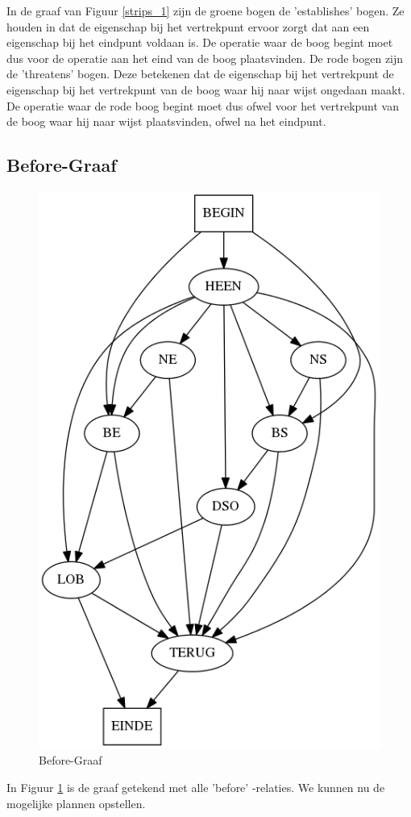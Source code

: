 \documentclass[alternative-exam.tex]{subfiles}
\begin{document}
In de graaf van Figuur \ref{strips_1} zijn de groene bogen de 'establishes' bogen. Ze houden in dat de eigenschap bij het vertrekpunt ervoor zorgt dat aan een eigenschap bij het eindpunt voldaan is. De operatie waar de boog begint moet dus voor de operatie aan het eind van de boog plaatsvinden.
De rode bogen zijn de 'threatens' bogen. Deze betekenen dat de eigenschap bij het vertrekpunt de eigenschap bij het vertrekpunt van de boog waar hij naar wijst ongedaan maakt. De operatie waar de rode boog begint moet dus ofwel voor het vertrekpunt van de boog waar hij naar wijst plaatsvinden, ofwel na het eindpunt.
\subsection{Before-Graaf}
\begin{figure}[H]
\centering
\caption{Before-Graaf}
\label{strips_2}
\includegraphics[scale=0.3]{resources/graphs/strips_2.png}
\end{figure}
In Figuur \ref{strips_2} is de graaf getekend met alle 'before'
-relaties. We kunnen nu de mogelijke plannen opstellen. 
\end{document}

